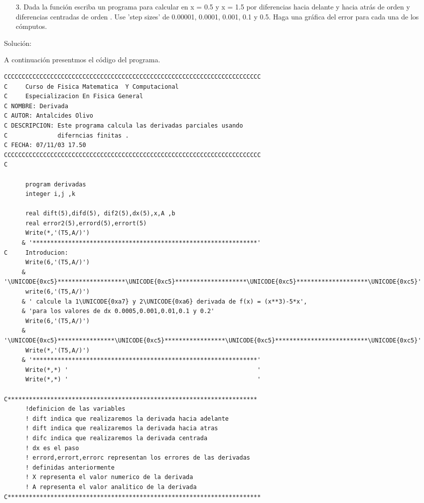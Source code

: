 \documentclass{article}
\begin{document}
\begin{enumerate}
\item[3.]  Dada la funci\'{o}n escriba un programa para calcular en x = 0.5
y x = 1.5 por diferencias hacia delante y hacia atr\'{a}s de orden y
diferencias centradas de orden . Use 'step sizes' de 0.00001, 0.0001, 0.001,
0.1 y 0.5. Haga una gr\'{a}fica del error para cada una de los c\'{o}mputos.
\end{enumerate}

Soluci\'{o}n:

A continuaci\'{o}n presentmos el c\'{o}digo del programa.
\begin{verbatim}
CCCCCCCCCCCCCCCCCCCCCCCCCCCCCCCCCCCCCCCCCCCCCCCCCCCCCCCCCCCCCCCCCCCCCCCC
C     Curso de Fisica Matematica  Y Computacional
C     Especializacion En Fisica General
C NOMBRE: Derivada
C AUTOR: Antalcides Olivo
C DESCRIPCION: Este programa calcula las derivadas parciales usando
C              diferncias finitas .
C FECHA: 07/11/03 17.50
CCCCCCCCCCCCCCCCCCCCCCCCCCCCCCCCCCCCCCCCCCCCCCCCCCCCCCCCCCCCCCCCCCCCCCCC
C
 
      program derivadas
      integer i,j ,k
 
      real dift(5),difd(5), dif2(5),dx(5),x,A ,b
      real error2(5),errord(5),errort(5)
      Write(*,'(T5,A/)')
     & '***************************************************************'
C     Introducion:
      Write(6,'(T5,A/)')
     & '\UNICODE{0xc5}*******************\UNICODE{0xc5}********************\UNICODE{0xc5}********************\UNICODE{0xc5}'
      write(6,'(T5,A/)')
     & ' calcule la 1\UNICODE{0xa7} y 2\UNICODE{0xa6} derivada de f(x) = (x**3)-5*x',
     & 'para los valores de dx 0.0005,0.001,0.01,0.1 y 0.2'
      Write(6,'(T5,A/)')
     & '\UNICODE{0xc5}****************\UNICODE{0xc5}*****************\UNICODE{0xc5}**************************\UNICODE{0xc5}'
      Write(*,'(T5,A/)')
     & '***************************************************************'
      Write(*,*) '                                                     '
      Write(*,*) '                                                     '
 
C**********************************************************************
      !definicion de las variables
      ! dift indica que realizaremos la derivada hacia adelante
      ! dift indica que realizaremos la derivada hacia atras
      ! difc indica que realizaremos la derivada centrada
      ! dx es el paso
      ! errord,errort,errorc representan los errores de las derivadas
      ! definidas anteriormente
      ! X representa el valor numerico de la derivada
      ! A representa el valor analitico de la derivada
C***********************************************************************
 

\end{verbatim}
\end{document}
